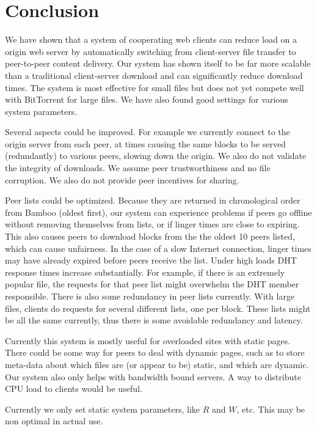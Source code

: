 \section{Conclusion}

We have shown that a system of cooperating web clients can reduce load on a origin web server by automatically switching
from client-server file transfer to peer-to-peer content delivery. Our system has shown itself to be far more scalable 
than a traditional client-server download and can significantly
reduce download times.  The system is most effective for small files but does not yet compete well with
BitTorrent for large files.  We have also found good settings for various system parameters.

Several aspects could be improved.  For example we currently connect to the origin
server from each peer, at times causing the same blocks to be served (redundantly) to various peers, slowing down the origin.
We also do not validate the integrity of downloads.  We assume peer trustworthiness and no file corruption.  We also do not provide peer incentives for sharing.

Peer lists could be optimized.  Because they are returned in chronological order from Bamboo (oldest first), our system can experience problems if peers
go offline without removing themselves from lists, or if linger times are close to expiring.  This also causes peers to download blocks 
from the the oldest 10 peers listed, which can cause unfairness. In the case of a slow Internet connection, linger times may have
already expired before peers receive the list.
Under high loads DHT response times increase substantially.  For example, if there is an extremely popular file, the 
requests for that peer list might overwhelm the DHT member responsible.  There is also some redundancy in peer lists currently.  
With large files, clients do requests for several different lists, one per block.  These lists might be all the same currently, thus
there is some avoidable redundancy and latency.

Currently this system is mostly useful for overloaded sites with static pages.  There could be some way for peers to deal with dynamic pages, such as to
store meta-data about which files are (or appear to be) static, and which are dynamic.  
Our system also only helps with bandwidth bound servers.  A way to distribute CPU load to clients would be useful.

Currently we only set static system parameters, like $R$ and $W$, etc.  This may be non optimal in actual use.
